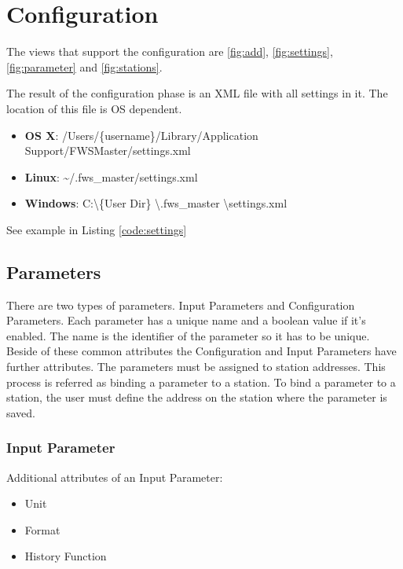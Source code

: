 \section{Configuration} %
\label{sec:configuration} 
The views that support the configuration are \ref{fig:add}, \ref{fig:settings}, \ref{fig:parameter} and \ref{fig:stations}.

The result of the configuration phase is an XML file with all settings in it. The location of this file is OS dependent. 
\begin{itemize}
    \item \textbf{OS X}: /Users/\{username\}/Library/Application Support/FWSMaster/settings.xml
    \item \textbf{Linux}: \textasciitilde /.fws\_master/settings.xml
    \item \textbf{Windows}: C:\textbackslash \{User Dir\} \textbackslash .fws\_master \textbackslash settings.xml
\end{itemize}

See example in Listing \ref{code:settings}

{\C  }

\subsection{Parameters} %
\label{sub:parameters}
There are two types of parameters. Input Parameters and Configuration Parameters. Each parameter has a unique name and a boolean value if it's enabled. The name is the identifier of the parameter so it has to be unique. Beside of these common attributes the Configuration and Input Parameters have further attributes. The parameters must be assigned to station addresses. This process is referred as binding a parameter to a station. To bind a parameter to a station, the user must define the address on the station where the parameter is saved.

\subsubsection{Input Parameter} %
\label{ssub:input_parameter}
Additional attributes of an Input Parameter:
\begin{itemize}
	\item Unit
	\item Format
	\item History Function
\end{itemize}

